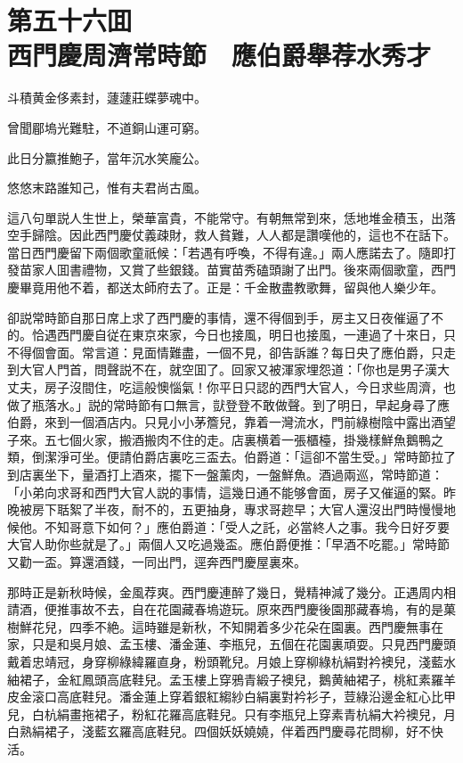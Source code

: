 
\chapter*{第五十六囬　\\西門慶周濟常時節　應伯爵舉荐水秀才}


\begin{myquote}
斗積黄金侈素封，蘧蘧莊蝶夢魂中。

曾聞郿塢光難駐，不道銅山運可窮。

此日分籝推鮑子，當年沉水笑龐公。

悠悠末路誰知己，惟有夫君尚古風。
\end{myquote}

這八句單説人生世上，榮華富貴，不能常守。有朝無常到來，恁地堆金積玉，出落空手歸陰。因此西門慶仗義疎財，救人貧難，人人都是讚嘆他的，這也不在話下。當日西門慶留下兩個歌童祇候：「若遇有呼喚，不得有違。」兩人應諾去了。隨即打發苗家人囬書禮物，又賞了些銀錢。苗實苗秀磕頭謝了出門。後來兩個歌童，西門慶畢竟用他不着，都送太師府去了。正是：千金散盡教歌舞，留與他人樂少年。

卻説常時節自那日席上求了西門慶的事情，還不得個到手，房主又日夜催逼了不的。恰遇西門慶自従在東京來家，今日也接風，明日也接風，一連過了十來日，只不得個會面。常言道：見面情難盡，一個不見，卻告訴誰？每日央了應伯爵，只走到大官人門首，問聲説不在，就空囬了。回家又被渾家埋怨道：「你也是男子漢大丈夫，房子沒間住，吃這般懊惱氣！你平日只認的西門大官人，今日求些周濟，也做了瓶落水。」説的常時節有口無言，獃登登不敢做聲。到了明日，早起身尋了應伯爵，來到一個酒店内。只見小小茅簷兒，靠着一灣流水，門前綠樹陰中露出酒望子來。五七個火家，搬酒搬肉不住的走。店裏横着一張櫃檯，掛幾樣鮮魚鵝鴨之類，倒潔淨可坐。便請伯爵店裏吃三盃去。伯爵道：「這卻不當生受。」常時節拉了到店裏坐下，量酒打上酒來，擺下一盤薰肉，一盤鮮魚。酒過兩巡，常時節道：「小弟向求哥和西門大官人説的事情，這幾日通不能够會面，房子又催逼的緊。昨晚被房下聒絮了半夜，耐不的，五更抽身，專求哥趂早；大官人還沒出門時慢慢地候他。不知哥意下如何？」應伯爵道：「受人之託，必當終人之事。我今日好歹要大官人助你些就是了。」兩個人又吃過幾盃。應伯爵便推：「早酒不吃罷。」常時節又勸一盃。算還酒錢，一同出門，逕奔西門慶屋裏來。

那時正是新秋時候，金風荐爽。西門慶連醉了幾日，覺精神減了幾分。正遇周内相請酒，便推事故不去，自在花園藏春塢遊玩。原來西門慶後園那藏春塢，有的是菓樹鮮花兒，四季不絶。這時雖是新秋，不知開着多少花朵在園裏。西門慶無事在家，只是和吳月娘、孟玉樓、潘金蓮、李瓶兒，五個在花園裏頑耍。只見西門慶頭戴着忠靖冠，身穿柳綠緯羅直身，粉頭靴兒。月娘上穿柳綠杭絹對衿襖兒，淺藍水紬裙子，金紅鳳頭高底鞋兒。孟玉樓上穿鴉青緞子襖兒，鵝黄紬裙子，桃紅素羅羊皮金滚口高底鞋兒。潘金蓮上穿着銀紅縐紗白絹裏對衿衫子，荳綠沿邊金紅心比甲兒，白杭絹畫拖裙子，粉紅花羅高底鞋兒。只有李瓶兒上穿素青杭絹大衿襖兒，月白熟絹裙子，淺藍玄羅高底鞋兒。四個妖妖嬈嬈，伴着西門慶尋花問柳，好不快活。


